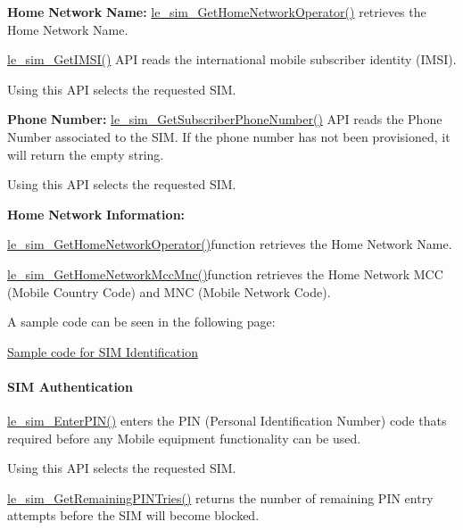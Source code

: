 {\bfseries Home} {\bfseries Network} {\bfseries Name\+:} \hyperlink{le__sim__interface_8h_a2fa95e7fdaaff2fd000e676b9cc34344}{le\+\_\+sim\+\_\+\+Get\+Home\+Network\+Operator()} retrieves the Home Network Name.

\hyperlink{le__sim__interface_8h_acc0f801f268630ea496377077a366374}{le\+\_\+sim\+\_\+\+Get\+I\+M\+S\+I()} A\+PI reads the international mobile subscriber identity (I\+M\+SI).

Using this A\+PI selects the requested S\+IM.

{\bfseries Phone} {\bfseries Number\+:} \hyperlink{le__sim__interface_8h_a5964edfe6070d40e0518c0a5d25aa628}{le\+\_\+sim\+\_\+\+Get\+Subscriber\+Phone\+Number()} A\+PI reads the Phone Number associated to the S\+IM. If the phone number has not been provisioned, it will return the empty string.

Using this A\+PI selects the requested S\+IM.

{\bfseries Home} {\bfseries Network} {\bfseries Information\+:} 
\begin{DoxyItemize}
\item \hyperlink{le__sim__interface_8h_a2fa95e7fdaaff2fd000e676b9cc34344}{le\+\_\+sim\+\_\+\+Get\+Home\+Network\+Operator()}function retrieves the Home Network Name.
\item \hyperlink{le__sim__interface_8h_a6bab381ed34046b553145bfbe53dfa3c}{le\+\_\+sim\+\_\+\+Get\+Home\+Network\+Mcc\+Mnc()}function retrieves the Home Network M\+CC (Mobile Country Code) and M\+NC (Mobile Network Code).
\end{DoxyItemize}

A sample code can be seen in the following page\+:
\begin{DoxyItemize}
\item \hyperlink{c_simTestIdentification}{Sample code for S\+IM Identification}
\end{DoxyItemize}\hypertarget{c_sim_le_sim_auth}{}\paragraph{S\+I\+M Authentication}\label{c_sim_le_sim_auth}
\hyperlink{le__sim__interface_8h_ac9cafacb5affb0b531534e3fc547ebd2}{le\+\_\+sim\+\_\+\+Enter\+P\+I\+N()} enters the P\+IN (Personal Identification Number) code that\textquotesingle{}s required before any Mobile equipment functionality can be used.

Using this A\+PI selects the requested S\+IM.

\hyperlink{le__sim__interface_8h_a8886dbb94aa732883ec5a67ddd345f98}{le\+\_\+sim\+\_\+\+Get\+Remaining\+P\+I\+N\+Tries()} returns the number of remaining P\+IN entry attempts before the S\+IM will become blocked.

